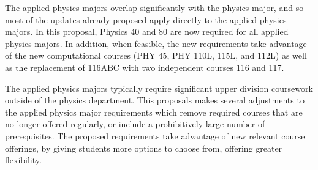 \documentclass[12pt]{article}
\begin{document}
The applied physics majors overlap significantly with the physics
major, and so most of the updates already proposed apply directly to
the applied physics majors.  In this proposal, Physics 40 and 80 are
now required for all applied physics majors.  In addition, when
feasible, the new requirements take advantage of the new computational
courses (PHY 45, PHY 110L, 115L, and 112L) as well as the replacement
of 116ABC with two independent courses 116 and 117.

The applied physics majors typically require significant upper
division coursework outside of the physics department.  This proposals
makes several adjustments to the applied physics major requirements
which remove required courses that are no longer offered regularly, or
include a prohibitively large number of prerequisites.  The proposed
requirements take advantage of new relevant course offerings, by
giving students more options to choose from, offering greater
flexibility.
\end{document}
